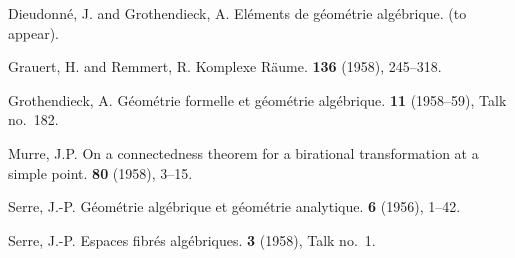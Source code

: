 \documentclass{article}
\begin{document}
\nocite{*}
\begin{thebibliography}{6}

  {Dieudonn\'{e}, J. and Grothendieck, A.}
  \newblock El\'{e}ments de g\'{e}om\'{e}trie alg\'{e}brique.
   (to appear).

  {Grauert, H. and Remmert, R.}
  \newblock Komplexe R\"{a}ume.
   \textbf{136} (1958), 245--318.

  {Grothendieck, A.}
  \newblock G\'{e}om\'{e}trie formelle et g\'{e}om\'{e}trie alg\'{e}brique.
   \textbf{11} (1958--59), Talk no.~182.

  {Murre, J.P.}
  \newblock On a connectedness theorem for a birational transformation at a simple point.
   \textbf{80} (1958), 3--15.

  {Serre, J.-P.}
  \newblock G\'{e}om\'{e}trie alg\'{e}brique et g\'{e}om\'{e}trie analytique.
   \textbf{6} (1956), 1--42.

  {Serre, J.-P.}
  \newblock Espaces fibr\'{e}s alg\'{e}briques.
   \textbf{3} (1958), Talk no.~1.

\end{thebibliography}
\end{document}
